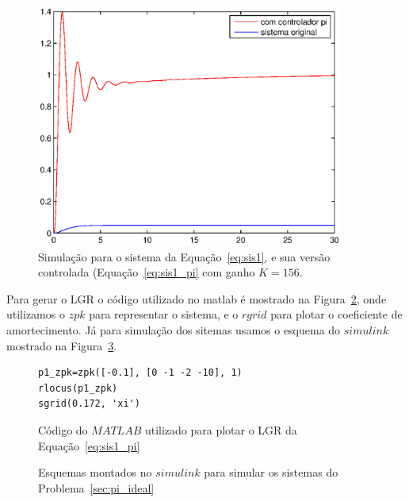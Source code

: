 \documentclass[a4paper]{article}
\begin{document}
\begin{figure}[ht]
   \centering
   \includegraphics[width=0.9\textwidth]{p1_sim}
   \caption{Simulação para o sistema da Equação~\ref{eq:sis1},
      e sua versão controlada (Equação~\ref{eq:sis1_pi} com ganho
      $K=156$.}
   \label{fig:sis1_sim}
\end{figure}

Para gerar o LGR o código utilizado no matlab é mostrado na Figura~\ref{verb:sis1_lgr},
onde utilizamos o $zpk$ para representar o sistema, e o $rgrid$ para plotar o coeficiente
de amortecimento. Já para simulação dos sitemas usamos o esquema do $simulink$ mostrado
na Figura~\ref{fig:sis1_simulink}.

\begin{figure}[ht]
\begin{verbatim}
p1_zpk=zpk([-0.1], [0 -1 -2 -10], 1)
rlocus(p1_zpk)
sgrid(0.172, 'xi')
\end{verbatim}
\caption{Código do $MATLAB$ utilizado para plotar o LGR da Equação~\ref{eq:sis1_pi}}
\label{verb:sis1_lgr}
\end{figure}

\begin{figure}[ht]
   \caption{Esquemas montados no $simulink$ para simular os sistemas
      do Problema~\ref{sec:pi_ideal}}
   \label{fig:sis1_simulink}
\end{figure}
\end{document}
